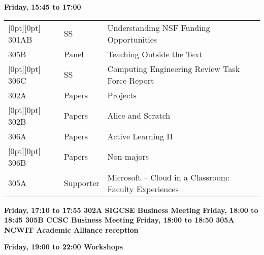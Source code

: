 \noindent
{\sffamily\bfseries Friday, 15:45 to 17:00}\newline\noindent
\begin{tabular*}{5in}{@{}p{0.5in}@{}p{0.75in}@{}p{3.75in}}

\rowcolor[gray]{0.9}[0pt][0pt] 301AB & SS & Understanding NSF Funding Opportunities \\

305B & Panel & Teaching Outside the Text \\

\rowcolor[gray]{0.9}[0pt][0pt] 306C & SS & Computing Engineering Review Task Force Report \\

302A & Papers & Projects \\

\rowcolor[gray]{0.9}[0pt][0pt] 302B & Papers & Alice and Scratch \\

306A & Papers & Active Learning II \\

\rowcolor[gray]{0.9}[0pt][0pt] 306B & Papers & Non-majors \\

305A & Supporter & Microsoft --  Cloud in a Classroom:  Faculty Experiences 
\end{tabular*}
\noindent
{\sffamily\bfseries Friday, 17:10 to 17:55 302A SIGCSE Business Meeting}\newline\noindent
\noindent
{\sffamily\bfseries Friday, 18:00 to 18:45 305B CCSC Business Meeting}\newline\noindent
{\sffamily\bfseries Friday, 18:00 to 18:50 305A NCWIT Academic Alliance reception}\newline\noindent

\noindent
{\sffamily\bfseries Friday, 19:00 to 22:00 Workshops}\newline\noindent

